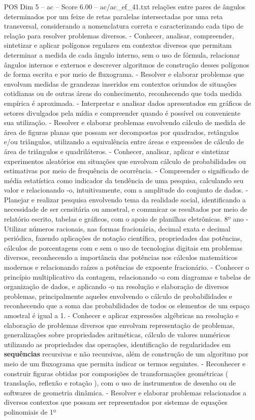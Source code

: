 \begin{textsample}{POS Dim 5 – ac – Score 6.00 – ac/ac\_ef\_41.txt}
relações entre pares de ângulos determinados por um feixe de retas paralelas intersectadas por uma reta transversal, considerando a nomenclatura correta e caracterizando cada tipo de relação para resolver problemas diversos. - Conhecer, analisar, compreender, sintetizar e aplicar polígonos regulares em contextos diversos que permitam determinar a medida de cada ângulo interno, sem o uso de fórmula, relacionar ângulos internos e externos e descrever algoritmos de construção desses polígonos de forma escrita e por meio de fluxograma. - Resolver e elaborar problemas que envolvam medidas de grandezas inseridos em contextos oriundos de situações cotidianas ou de outras áreas do conhecimento, reconhecendo que toda medida empírica é aproximada. - Interpretar e analisar dados apresentados em gráficos de setores divulgados pela mídia e compreender quando é possível ou conveniente sua utilização. - Resolver e elaborar problemas envolvendo cálculo de medida de área de figuras planas que possam ser decompostas por quadrados, retângulos e/ou triângulos, utilizando a equivalência entre áreas e expressões de cálculo de área de triângulos e quadriláteros. - Conhecer, analisar, aplicar e sintetizar experimentos aleatórios em situações que envolvam cálculo de probabilidades ou estimativas por meio de frequência de ocorrência. - Compreender o significado de média estatística como indicador da tendência de uma pesquisa, calculando seu valor e relacionando -o, intuitivamente, com a amplitude do conjunto de dados. - Planejar e realizar pesquisa envolvendo tema da realidade social, identificando a necessidade de ser censitária ou amostral, e comunicar os resultados por meio de relatório escrito, tabelas e gráficos, com o apoio de planilhas eletrônicas. 8º ano - Utilizar números racionais, nas formas fracionária, decimal exata e decimal periódica, fazendo aplicações de notação científica, propriedades das potências, cálculos de porcentagens com e sem o uso de tecnologias digitais em problemas diversos, reconhecendo a importância das potências nos cálculos matemáticos modernos e relacionando raízes a potências de expoente fracionário. - Conhecer o princípio multiplicativo da contagem, relacionando -o com diagramas e tabelas de organização de dados, e aplicando -o na resolução e elaboração de diversos problemas, principalmente aqueles envolvendo o cálculo de probabilidades e reconhecendo que a soma das probabilidades de todos os elementos de um espaço amostral é igual a 1. - Conhecer e aplicar expressões algébricas na resolução e elaboração de problemas diversos que envolvam representação de problemas, generalizações sobre propriedades aritméticas, cálculo de valores numéricos utilizando as propriedades das operações, identificação de regularidades em \textbf{sequências} recursivas e não recursivas, além de construção de um algoritmo por meio de um fluxograma que permita indicar os termos seguintes. - Reconhecer e construir figuras obtidas por composições de transformações geométricas ( translação, reflexão e rotação ), com o uso de instrumentos de desenho ou de softwares de geometria dinâmica. - Resolver e elaborar problemas relacionados a diversos contextos que possam ser representados por sistemas de equações polinomiais de 1º 
\end{textsample}

